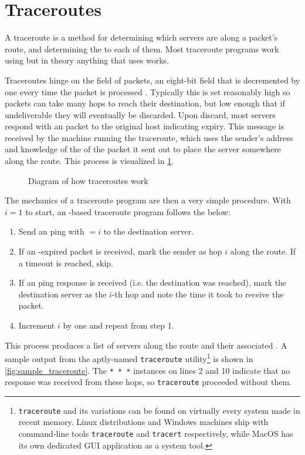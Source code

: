 \section{Traceroutes}\label{sec:background_traceroutes}

A traceroute is a method for determining which servers are along a packet's route, and determining the \rtt to each of them. Most traceroute programs work using \icmp but in theory anything that uses \ip works.

Traceroutes hinge on the \ttl field of \ip packets, an eight-bit field that is decremented by one every time the packet is processed \cite{rfc791}. Typically this is set reasonably high so packets can take many hops to reach their destination, but low enough that if undeliverable they will eventually be discarded. Upon discard, most servers respond with an \icmp packet to the original host indicating \ttl expiry. This message is received by the machine running the traceroute, which uses the sender's \ip address and knowledge of the \ttl of the packet it sent out to place the server somewhere along the route. This process is visualized in \cref{fig:traceroute_diagram}.

\begin{figure}[h]
    \centering
    \caption{Diagram of how traceroutes work}
    \label{fig:traceroute_diagram}
\end{figure}

The mechanics of a traceroute program are then a very simple procedure. With $i=1$ to start, an \icmp-based traceroute program follows the below:

\begin{enumerate}
    \item Send an \icmp ping with \TTL$=i$ to the destination server.
    \item If an \icmp \ttl-expired packet is received, mark the sender as hop $i$ along the route. If a timeout is reached, skip.
    \item If an \icmp ping response is received (i.e. the destination was reached), mark the destination server as the $i$-th hop and note the time it took to receive the packet.
    \item Increment $i$ by one and repeat from step 1.
\end{enumerate}

This process produces a list of servers along the route and their associated \rtts. A sample output from the aptly-named \texttt{traceroute} utility\footnote{\texttt{traceroute} and its variations can be found on virtually every system made in recent memory. Linux distributions and Windows machines ship with command-line tools \texttt{traceroute} and \texttt{tracert} respectively, while MacOS has its own dedicated GUI application as a system tool.} is shown in \cref{fig:sample_traceroute}. The \texttt{* * *} instances on lines 2 and 10 indicate that no response was received from these hops, so \texttt{traceroute} proceeded without them.

